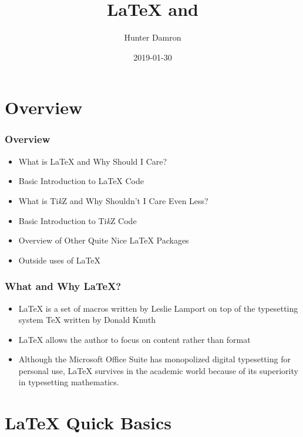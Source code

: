 \documentclass{beamer}
\title{\LaTeX{} and \TikZ}
\institute[]{Association for Computing Machinery \\ University of South Carolina}
\author{Hunter Damron}
\date{2019-01-30}
\let\oldLaTeX\LaTeX
\renewcommand{\LaTeX}{\oldLaTeX\xspace}
\newcommand{\TikZ}{Ti\textit{k}Z\xspace}
\begin{document}
	\renewcommand{\usepackage}[1]{}  %
	\maketitle

	\section{Overview}
	\begin{frame}
		\frametitle{Overview}
		\begin{itemize}
			\item What is \LaTeX and Why Should I Care?
			\item Basic Introduction to \LaTeX Code
			\item What is \TikZ and Why Shouldn't I Care Even Less?
			\item Basic Introduction to \TikZ Code
			\item Overview of Other Quite Nice \LaTeX Packages
			\item Outside uses of \LaTeX
		\end{itemize}
	\end{frame}

	\begin{frame}
		\frametitle{What and Why \LaTeX?}
		\begin{itemize}
			\item \LaTeX is a set of macros  written by Leslie Lamport on top of the typesetting system \TeX{} written by Donald Knuth~\cite{wiki}
			\item \LaTeX allows the author to focus on content rather than format
			\item Although the Microsoft Office Suite  has monopolized digital typesetting for personal use, \LaTeX survives in the academic world because of its superiority in typesetting mathematics.
		\end{itemize}
	\end{frame}

	\section{\LaTeX Quick Basics}
\end{document}
